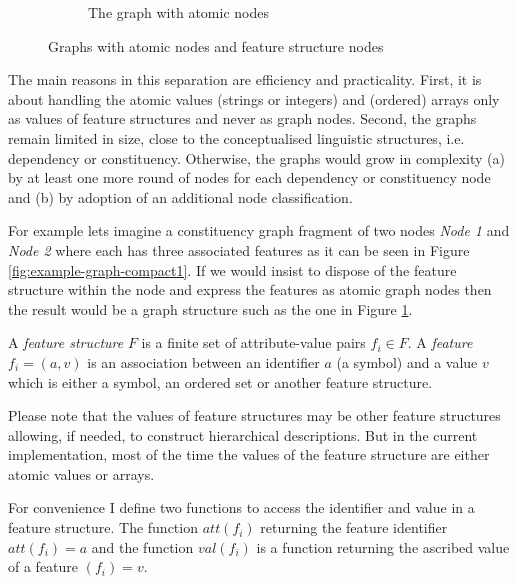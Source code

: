 \begin{figure}[!ht]
\begin{subfigure}[b]{0.5\textwidth}
        \caption{The graph with atomic nodes}
        \label{fig:example-graph-compact2}
    \end{subfigure}%
    \caption{Graphs with atomic nodes and feature structure nodes}
    \label{fig:example-graph-compact}
\end{figure}

The main reasons in this separation are efficiency and practicality. First, it is about handling the atomic values (strings or integers) and (ordered) arrays only as values of feature structures and never as graph nodes. Second, the graphs remain limited in size, close to the conceptualised linguistic structures, i.e. dependency or constituency. Otherwise, the graphs would grow in complexity (a) by at least one more round of nodes for each dependency or constituency node and (b) by adoption of an additional node classification.

For example lets imagine a constituency graph fragment of two nodes \textit{Node 1} and \textit{Node 2} where each has three associated features as it can be seen in Figure \ref{fig:example-graph-compact1}. If we would insist to dispose of the feature structure within the node and express the features as atomic graph nodes then the result would be a graph structure such as the one in Figure \ref{fig:example-graph-compact2}.

\begin{definition}\label{def:fs}
	A \textit{feature structure} $F$ is a finite set of attribute-value pairs $f_{i} \in F$. A \textit{feature} $f_{i}=(a,v)$ is an association between an identifier $a$ (a symbol) and a value $v$ which is either a symbol, an ordered set or another feature structure. 
\end{definition}

Please note that the values of feature structures may be other feature structures allowing, if needed, to construct hierarchical descriptions. But in the current implementation, most of the time the values of the feature structure are either atomic values or arrays. 

For convenience I define two functions to access the identifier and value in a feature structure. The function $att(f_{i})$ returning the feature identifier $att(f_{i})=a$ and the function $val(f_{i})$ is a function returning the ascribed value of a feature $(f_{i})=v$. 

